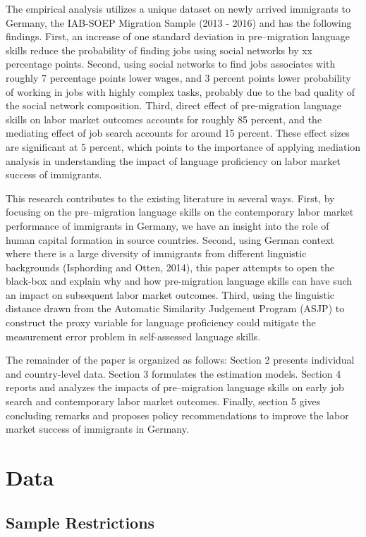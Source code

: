 \documentclass[12pt,a4paper]{article}
\begin{document}
The empirical analysis utilizes a unique dataset on newly arrived immigrants to Germany, the IAB-SOEP Migration Sample (2013 - 2016) and has the following findings. First, an increase of one standard deviation in pre--migration language skills reduce the probability of finding jobs using social networks by xx percentage points. Second, using social networks to find jobs associates with roughly 7 percentage points lower wages, and 3 percent points lower probability of working in jobs with highly complex tasks, probably due to the bad quality of the social network composition. Third, direct effect of pre-migration language skills on labor market outcomes accounts for roughly 85 percent, and the mediating effect of job search accounts for around 15 percent. These effect sizes are significant at 5 percent, which points to the importance of applying mediation analysis in understanding the impact of language proficiency on labor market success of immigrants.

This research contributes to the existing literature in several ways. First, by focusing on the pre--migration language skills on the contemporary labor market performance of immigrants in Germany, we have an insight into the role of human capital formation in source countries. Second, using German context where there is a large diversity of immigrants from different linguistic backgrounds (Isphording and Otten, 2014), this paper attempts to open the black-box and explain why and how pre-migration language skills can have such an impact on subsequent labor market outcomes. Third, using the linguistic distance drawn from the Automatic Similarity Judgement Program (ASJP) to construct the proxy variable for language proficiency could mitigate the measurement error problem in self-assessed language skills.

The remainder of the paper is organized as follows: Section 2 presents individual and country-level data. Section 3 formulates the estimation models. Section 4 reports and analyzes the impacts of pre--migration language skills on early job search and contemporary labor market outcomes. Finally, section 5 gives concluding remarks and proposes policy recommendations to improve the labor market success of immigrants in Germany.

\section{Data}
\subsection{Sample Restrictions}
\end{document}
